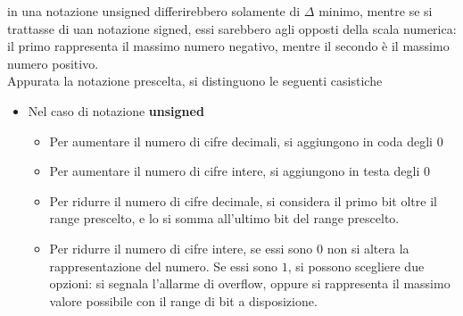 \documentclass[a4paper]{extarticle}
\begin{document}
\noindent
in una notazione unsigned differirebbero solamente di $\Delta$ minimo, mentre se si trattasse di uan notazione signed, essi sarebbero agli opposti della scala numerica: il primo rappresenta il massimo numero negativo, mentre il secondo è il massimo numero positivo.\\
Appurata la notazione prescelta, si distinguono le seguenti casistiche
\begin{itemize}
    \item Nel caso di notazione \textbf{unsigned}
    \begin{itemize}
        \item Per aumentare il numero di cifre decimali, si aggiungono in coda degli $0$
        \item Per aumentare il numero di cifre intere, si aggiungono in testa degli $0$
        \item Per ridurre il numero di cifre decimale, si considera il primo bit oltre il range prescelto, e lo si somma all'ultimo bit del range prescelto.
        \item Per ridurre il numero di cifre intere, se essi sono $0$ non si altera la rappresentazione del numero. Se essi sono $1$, si possono scegliere due opzioni: si segnala l'allarme di overflow, oppure si rappresenta il massimo valore possibile con il range di bit a disposizione.
    \end{itemize}
    

\end{itemize}
\end{document}
